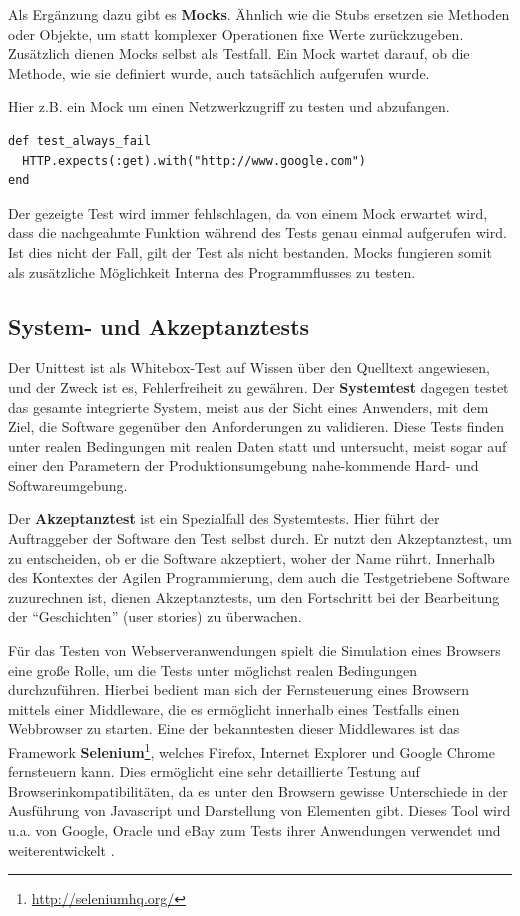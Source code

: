   
  Als Ergänzung dazu gibt es \textbf{Mocks}. Ähnlich wie die Stubs ersetzen sie Methoden oder Objekte, um statt komplexer Operationen fixe Werte zurückzugeben. Zusätzlich dienen Mocks selbst als Testfall. Ein Mock wartet darauf, ob die Methode, wie sie definiert wurde, auch tatsächlich aufgerufen wurde.
  
  Hier z.B. ein Mock um einen Netzwerkzugriff zu testen und abzufangen.
  \begin{lstlisting}
def test_always_fail
  HTTP.expects(:get).with("http://www.google.com")
end
  \end{lstlisting}
  Der gezeigte Test wird immer fehlschlagen, da von einem Mock erwartet wird, dass die nachgeahmte Funktion während des Tests genau einmal aufgerufen wird. Ist dies nicht der Fall, gilt der Test als nicht bestanden. Mocks fungieren somit als zusätzliche Möglichkeit Interna des Programmflusses zu testen. 

\subsection{System- und Akzeptanztests}

Der Unittest ist als Whitebox-Test auf Wissen über den Quelltext angewiesen, und der Zweck ist es, Fehlerfreiheit zu gewähren. Der \textbf{Systemtest} dagegen testet das gesamte integrierte System, meist aus der Sicht eines Anwenders, mit dem Ziel, die Software gegenüber den Anforderungen zu validieren. Diese Tests finden unter realen Bedingungen mit realen Daten statt und untersucht, meist sogar auf einer den Parametern der Produktionsumgebung nahe-kommende Hard- und Softwareumgebung.

Der \textbf{Akzeptanztest} ist ein Spezialfall des Systemtests. Hier führt der Auftraggeber der Software den Test selbst durch. Er nutzt den Akzeptanztest, um zu entscheiden, ob er die Software akzeptiert, woher der Name rührt.
Innerhalb des Kontextes der Agilen Programmierung, dem auch die Testgetriebene Software zuzurechnen ist, dienen Akzeptanztests, um den Fortschritt bei der Bearbeitung der "`Geschichten"' (user stories) zu überwachen.

Für das Testen von Webserveranwendungen spielt die Simulation eines Browsers eine große Rolle, um die Tests unter möglichst realen Bedingungen durchzuführen. Hierbei bedient man sich der Fernsteuerung eines Browsern mittels einer Middleware, die es ermöglicht innerhalb eines Testfalls einen Webbrowser zu starten. Eine der bekanntesten dieser Middlewares ist das Framework \textbf{Selenium}\footnote{\url{http://seleniumhq.org/}}, welches Firefox, Internet Explorer und Google Chrome fernsteuern kann. Dies ermöglicht eine sehr detaillierte Testung auf Browserinkompatibilitäten, da es unter den Browsern gewisse Unterschiede in der Ausführung von Javascript und Darstellung von Elementen gibt. Dieses Tool wird u.a. von Google, Oracle und eBay zum Tests ihrer Anwendungen verwendet und weiterentwickelt \citep{selenium_hq_selenium_2010}.
